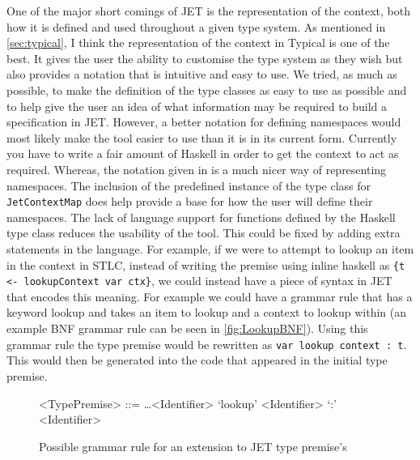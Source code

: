 One of the major short comings of JET is the representation of the context, both how it is defined and used throughout a given type system.
As mentioned in \autoref{sec:typical}, I think the representation of the context in Typical is one of the best.
It gives the user the ability to customise the type system as they wish but also provides a notation that is intuitive and easy to use.
We tried, as much as possible, to make the definition of the type classes as easy to use as possible and to help give the user an idea of what information may be required to build a specification in JET.
However, a better notation for defining namespaces would most likely make the tool easier to use than it is in its current form.
Currently you have to write a fair amount of Haskell in order to get the context to act as required.
Whereas, the notation given in \textcite{grimm2007typical} is a much nicer way of representing namespaces.
The inclusion of the predefined instance of the type class for \texttt{JetContextMap} does help provide a base for how the user will define their namespaces.
The lack of language support for functions defined by the Haskell type class reduces the usability of the tool.
This could be fixed by adding extra statements in the language.
For example, if we were to attempt to lookup an item in the context in STLC, instead of writing the premise using inline haskell as \texttt{\{t <- lookupContext var ctx\}}, we could instead have a piece of syntax in JET that encodes this meaning.
For example we could have a grammar rule that has a keyword lookup and takes an item to lookup and a context to lookup within (an example BNF grammar rule can be seen in \autoref{fig:LookupBNF}).
Using this grammar rule the type premise would be rewritten as \texttt{var lookup context : t}.
This would then be generated into the code that appeared in the initial type premise.

\begin{figure}[]
    \centering
    \begin{grammar}
        <TypePremise> ::= \dots \alt <Identifier> `lookup' <Identifier> `:' <Identifier>
    \end{grammar}
    \caption{Possible grammar rule for an extension to JET type premise's}
    \label{fig:LookupBNF}
\end{figure}

